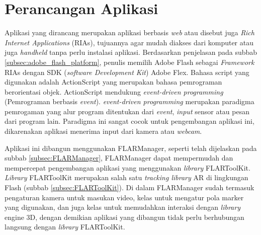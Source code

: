 
\section {Perancangan Aplikasi}
\label{sec:desain_aplikasi}
Aplikasi yang dirancang merupakan aplikasi berbasis \textit{web} atau disebut juga \textit{Rich Internet Applications} (RIAs), tujuannya agar mudah diakses dari komputer atau juga \textit{handheld} tanpa perlu instalasi aplikasi. Berdasarkan penjelasan pada subbab \ref{subsec:adobe_flash_platform}, penulis memilih Adobe Flash sebagai \textit{Framework} RIAs dengan SDK (\textit{software Development Kit}) Adobe Flex. Bahasa script yang digunakan adalah ActionScript yang merupakan bahasa pemrograman berorientasi objek. ActionScript mendukung \textit{event-driven programming} (Pemrograman berbasis \textit{event}). \textit{event-driven programming} merupakan paradigma pemrogaman yang alur program ditentukan dari \textit{event}, \textit{input} sensor atau pesan dari program lain. Paradigma ini sangat cocok untuk pengembangan aplikasi ini, dikarenakan aplikasi menerima input dari kamera atau \textit{webcam}.

Aplikasi ini dibangun menggunakan FLARManager, seperti telah dijelaskan pada subbab \ref{subsec:FLARManager}, FLARManager dapat mempermudah dan mempercepat pengembangan aplikasi yang menggunakan \textit{library} FLARToolKit. \textit{Library} FLARToolKit merupakan salah satu \textit{tracking library} AR di lingkungan Flash (subbab \ref{subsec:FLARToolKit}). Di dalam FLARManager sudah termasuk pengaturan kamera untuk masukan video, kelas untuk mengatur pola marker yang digunakan, dan juga kelas untuk memudahkan interaksi dengan \textit{library} engine 3D, dengan demikian aplikasi yang dibangun tidak perlu berhubungan langsung dengan \textit{library} FLARToolKit.

